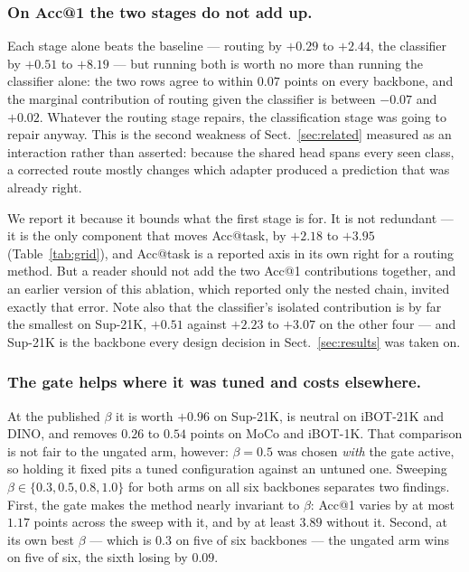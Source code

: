 \documentclass[runningheads]{llncs}
\begin{document}
\subsubsection{On Acc@1 the two stages do not add up.}
Each stage alone beats the baseline --- routing by $+0.29$ to $+2.44$, the
classifier by $+0.51$ to $+8.19$ --- but running both is worth no more than
running the classifier alone: the two rows agree to within $0.07$ points on
every backbone, and the marginal contribution of routing given the classifier is
between $-0.07$ and $+0.02$. Whatever the routing stage repairs, the
classification stage was going to repair anyway. This is the second weakness of
Sect.~\ref{sec:related} measured as an interaction rather than asserted: because
the shared head spans every seen class, a corrected route mostly changes which
adapter produced a prediction that was already right.

We report it because it bounds what the first stage is for. It is not redundant
--- it is the only component that moves Acc@task, by $+2.18$ to $+3.95$
(Table~\ref{tab:grid}), and Acc@task is a reported axis in its own right for a
routing method. But a reader should not add the two Acc@1 contributions
together, and an earlier version of this ablation, which reported only the
nested chain, invited exactly that error. Note also that the classifier's
isolated contribution is by far the smallest on Sup-21K, $+0.51$ against $+2.23$
to $+3.07$ on the other four --- and Sup-21K is the backbone every design
decision in Sect.~\ref{sec:results} was taken on.

\subsubsection{The gate helps where it was tuned and costs elsewhere.}
At the published $\beta$ it is worth $+0.96$ on Sup-21K, is neutral on iBOT-21K
and DINO, and removes $0.26$ to $0.54$ points on MoCo and iBOT-1K. That
comparison is not fair to the ungated arm, however: $\beta=0.5$ was
chosen \emph{with} the gate active, so holding it fixed pits a tuned
configuration against an untuned one. Sweeping $\beta \in \{0.3,0.5,0.8,1.0\}$
for both arms on all six backbones separates two findings. First, the gate makes
the method nearly invariant to $\beta$: Acc@1 varies by at most $1.17$ points
across the sweep with it, and by at least $3.89$ without it. Second, at its own
best $\beta$ --- which is $0.3$ on five of six backbones --- the ungated arm wins
on five of six, the sixth losing by $0.09$.
\end{document}
